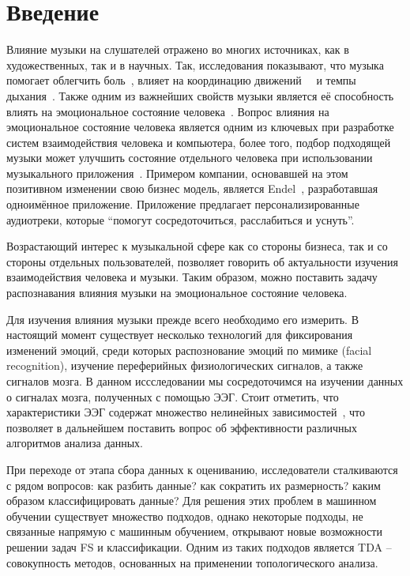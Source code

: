 \documentclass{article}
\begin{document}
\section{Введение}
Влияние музыки на слушателей отражено во многих источниках, как в художественных, так и в научных. Так, исследования показывают, что музыка помогает облегчить боль~\cite{Newbold}, влияет на координацию движений~\cite{Repp}~\cite{Aschersleben} и темпы дыхания~\cite{Siwiak}. Также одним из важнейших свойств музыки является её способность влиять на эмоциональное состояние человека~\cite{Koelsch}. Вопрос влияния на эмоциональное состояние человека является одним из ключевых при разработке систем взаимодействия человека и компьютера, более того, подбор подходящей музыки может улучшить состояние отдельного человека при использовании музыкального приложения~\cite{Leslie}. Примером компании, основавшей на этом позитивном изменении свою бизнес модель, является Endel~\cite{Endel}, разработавшая одноимённое приложение. Приложение предлагает персонализированные аудиотреки, которые ``помогут сосредоточиться, расслабиться и уснуть''.

Возрастающий интерес к музыкальной сфере как со стороны бизнеса, так и со стороны отдельных пользователей, позволяет говорить об актуальности изучения взаимодействия человека и музыки. Таким образом, можно поставить задачу распознавания влияния музыки на эмоциональное состояние человека. 

Для изучения влияния музыки прежде всего необходимо его измерить. В настоящий момент существует несколько технологий для фиксирования изменений эмоций, среди которых распознование эмоций по мимике (facial recognition), изучение переферийных физиологических сигналов, а также сигналов мозга. В данном иссследовании мы сосредоточимся на изучении данных о сигналах мозга, полученных с помощью ЭЭГ. Стоит отметить, что характеристики ЭЭГ содержат множество нелинейных зависимостей~\cite{Wang}, что позволяет в дальнейшем поставить вопрос об эффективности различных алгоритмов анализа данных. 

При переходе от этапа сбора данных к оцениванию, исследователи сталкиваются с рядом вопросов: как разбить данные? как сократить их размерность? каким образом классифицировать данные? Для решения этих проблем в машинном обучении существует множество подходов, однако некоторые подходы, не связанные напрямую с машинным обучением, открывают новые возможности решении задач FS и классификации. Одним из таких подходов является TDA -- совокупность методов, основанных на применении топологического анализа. 
\end{document}

